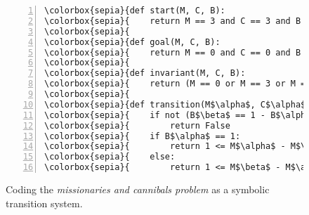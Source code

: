 \begin{figure}[!ht]
\centering
\begin{Verbatim}[frame         = single, 
                 framesep      = 0.3cm,
                 framerule=0.5mm,
                 rulecolor=\color{black},
                 firstnumber   = 1,
                 numbers       = left,
                 numbersep     = 0.3cm,
                 xleftmargin   = 0.8cm,
                 xrightmargin  = 0.8cm,
                 commandchars  = \\\{\},
                 codes         = {\catcode`$=3\catcode`^=7}
               ] 
\colorbox{sepia}{def start(M, C, B):                                                       }
\colorbox{sepia}{    return M == 3 and C == 3 and B == 1                                   }
\colorbox{sepia}{                                                                          }
\colorbox{sepia}{def goal(M, C, B):                                                        }
\colorbox{sepia}{    return M == 0 and C == 0 and B == 0                                   }
\colorbox{sepia}{                                                                          }
\colorbox{sepia}{def invariant(M, C, B):                                                   }
\colorbox{sepia}{    return (M == 0 or M == 3 or M == C) and B <= 1                        }
\colorbox{sepia}{                                                                          }
\colorbox{sepia}{def transition(M$\alpha$, C$\alpha$, B$\alpha$, M$\beta$, C$\beta$, B$\beta$):                                   }
\colorbox{sepia}{    if not (B$\beta$ == 1 - B$\alpha$):                                                }
\colorbox{sepia}{        return False                                                      }
\colorbox{sepia}{    if B$\alpha$ == 1:                                                           }
\colorbox{sepia}{        return 1 <= M$\alpha$ - M$\beta$ + C$\alpha$ - C$\beta$ <= 2 and M$\beta$ <= M$\alpha$ and C$\beta$ <= C$\alpha$     }
\colorbox{sepia}{    else:                                                                 }
\colorbox{sepia}{        return 1 <= M$\beta$ - M$\alpha$ + C$\beta$ - C$\alpha$ <= 2 and M$\beta$ >= M$\alpha$ and C$\beta$ >= C$\alpha$     }
\end{Verbatim}
\vspace*{-0.3cm}
\caption{Coding the \emph{missionaries and cannibals problem} as a symbolic transition system.}
\label{fig:Missionaries-STS.ipynb}
\end{figure}

